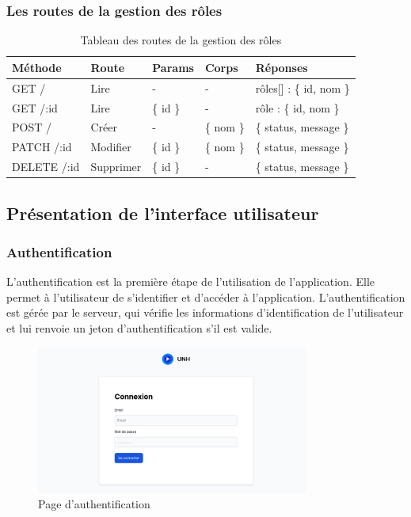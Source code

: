 \subsubsection*{Les routes de la gestion des rôles}\label{subsec:routes-role}

\begin{table}[ht]
  \caption{Tableau des routes de la gestion des rôles}
  \label{tab:routes-role}
  \begin{tabular}{|p{1.5cm}|p{1.5cm}|p{1cm}|p{2.5cm}|p{3.5cm}| }
    \hline
    Méthode & Route & Params & Corps & Réponses \\
    \hline
    GET / & Lire & - & - & rôles[] :  \{ id, nom \} \\
    \hline
    GET /:id & Lire & \{ id \} & - & rôle : \{ id, nom \} \\
    \hline
    POST / & Créer & - & \{ nom \} & \{ status, message \} \\
    \hline
    PATCH /:id & Modifier & \{ id \} & \{ nom \} & \{ status, message \} \\
    \hline
    DELETE /:id & Supprimer & \{ id \} & - & \{ status, message \} \\
    \hline
  \end{tabular}
\end{table}

\subsection{Présentation de l'interface utilisateur}\label{sec:presentation-de-l-interface-utilisateur}

\subsubsection*{Authentification}\label{subsec:authentification}
L'authentification est la première étape de l'utilisation de l'application. Elle permet à l'utilisateur de s'identifier et d'accéder à l'application. L'authentification est gérée par le serveur, qui vérifie les informations d'identification de l'utilisateur et lui renvoie un jeton d'authentification s'il est valide.

\begin{figure}[ht]
  \centering
  \includegraphics[width=0.8\textwidth]{gfx/ui/login}
  \caption{Page d'authentification}
  \label{fig:login}
\end{figure}


